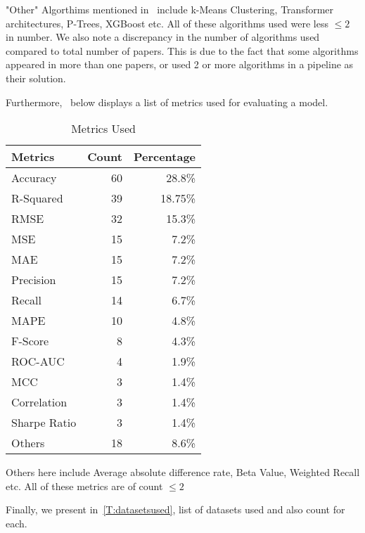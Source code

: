 \documentclass[11pt]{article}
\begin{document}
"Other" Algorthims mentioned in~ include k-Means Clustering, Transformer architectures, P-Trees, XGBoost etc. All of these algorithms used were less $\le 2$ in number. We also note a discrepancy in the number of algorithms used compared to total number of papers. This is due to the fact that some algorithms appeared in more than one papers, or used 2 or more algorithms in a pipeline as their solution. 

Furthermore,~ below displays a list of metrics used for evaluating a model.

\begin{table}
\caption{Metrics Used}
\label{T:metrics}
\begin{tabularx}{\columnwidth}{X r r}
\toprule
Metrics & Count & Percentage \\
\midrule
Accuracy & 60 & 28.8\% \\
R-Squared  & 39 & 18.75\% \\
RMSE & 32 & 15.3\% \\
MSE & 15 & 7.2\%\\
MAE & 15 & 7.2\% \\
Precision & 15 & 7.2\%\\
Recall & 14 & 6.7\% \\
MAPE & 10 & 4.8\%\\
F-Score & 8 & 4.3\% \\
ROC-AUC & 4 & 1.9\% \\
MCC & 3 & 1.4\% \\
Correlation & 3 & 1.4\% \\
Sharpe Ratio & 3 & 1.4\% \\
Others & 18 & 8.6\% \\


\midrule
\end{tabularx}
\end{table}

Others here include Average absolute difference rate, Beta Value, Weighted Recall etc. All of these metrics are of count $\le 2$

Finally, we present in~\cref{T:datasetsused}, list of datasets used and also count for each.
\end{document}
